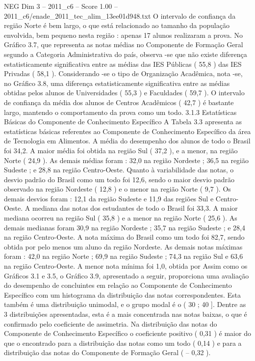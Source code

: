 \begin{textsample}{NEG Dim 3 – 2011\_c6 – Score 1.00 – 2011\_c6/enade\_2011\_tec\_alim\_13ee01d948.txt}
O intervalo de confiança da região Norte é bem largo, o que está relacionado ao tamanho da população envolvida, bem pequeno nesta região : apenas 17 alunos realizaram a prova.
No Gráfico 3.7, que representa as notas médias no Componente de Formação Geral segundo a Categoria Administrativa do país, observa -se que não existe diferença estatisticamente significativa entre as médias das IES Públicas ( 55,8 ) das IES Privadas ( 58,1 ).
Considerando -se o tipo de Organização Acadêmica, nota -se, no Gráfico 3.8, uma diferença estatisticamente significativa entre as médias obtidas pelos alunos de Universidades ( 55,3 ) e Faculdades ( 59,7 ).
O intervalo de confiança da média dos alunos de Centros Acadêmicos ( 42,7 ) é bastante largo, mantendo o comportamento da prova como um todo. 3.1.3 Estatísticas Básicas do Componente de Conhecimento Específico A Tabela 3.3 apresenta as estatísticas básicas referentes ao Componente de Conhecimento Específico da área de Tecnologia em Alimentos.
A média do desempenho dos alunos de todo o Brasil foi 34,2.
A maior média foi obtida na região Sul ( 37,2 ), e a menor, na região Norte ( 24,9 ).
As demais médias foram : 32,0 na região Nordeste ; 36,5 na região Sudeste ; e 28,8 na região Centro-Oeste.
Quanto à variabilidade das notas, o desvio padrão do Brasil como um todo foi 12,6, sendo o maior desvio padrão observado na região Nordeste ( 12,8 ) e o menor na região Norte ( 9,7 ).
Os demais desvios foram : 12,1 da região Sudeste e 11,9 das regiões Sul e Centro-Oeste.
A mediana das notas dos estudantes de todo o Brasil foi 33,3.
A maior mediana ocorreu na região Sul ( 35,8 ) e a menor na região Norte ( 25,6 ).
As demais medianas foram 30,9 na região Nordeste ; 35,7 na região Sudeste ; e 28,4 na região Centro-Oeste.
A nota máxima do Brasil como um todo foi 82,7, sendo obtida por pelo menos um aluno da região Nordeste.
As demais notas máximas foram : 42,0 na região Norte ; 69,9 na região Sudeste ; 74,3 na região Sul e 63,6 na região Centro-Oeste.
A menor nota mínima foi 1,0, obtida por Assim como os Gráficos 3.1 e 3.5, o Gráfico 3.9, apresentado a seguir, proporciona uma avaliação do desempenho de concluintes em relação ao Componente de Conhecimento Específico com um histograma da distribuição das notas correspondentes.
Esta também é uma distribuição unimodal, e o grupo modal é o ( 30 ; 40 ].
Dentre as 3 distribuições apresentadas, esta é a mais concentrada nas notas baixas, o que é confirmado pelo coeficiente de assimetria.
Na distribuição das notas do Componente de Conhecimento Específico o coeficiente positivo ( 0,31 ) é maior do que o encontrado para a distribuição das notas como um todo ( 0,14 ) e para a distribuição das notas do Componente de Formação Geral ( – 0,32 ).

\end{textsample}
